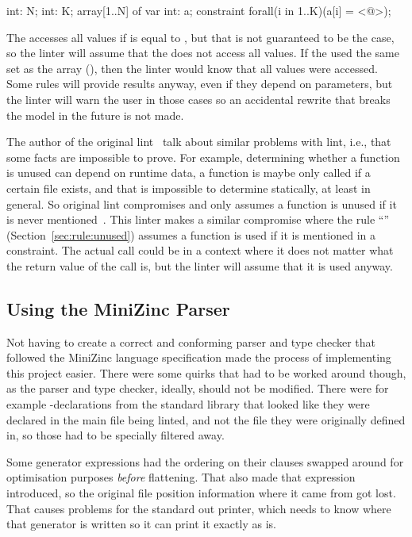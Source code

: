 \documentclass[a4paper,12pt]{article}
\newcommand{\ruleref}[1]{``\nameref{sec:rule:#1}'' (Section~\ref{sec:rule:#1})}
\begin{document}
\begin{mznnobreak}
int: N; int: K;
array[1..N] of var int: a;
constraint forall(i in 1..K)(a[i] = <@\dots@>);
\end{mznnobreak}

The  accesses all values if  is equal to , but that is not
guaranteed to be the case, so the linter will assume that the  does not access
all values. If the  used the same set as the array (), then the
linter would know that all values were accessed. Some rules will provide results anyway,
even if they depend on parameters, but the linter will warn the user in those cases so an
accidental rewrite that breaks the model in the future is not made.

The author of the original lint~\cite{lint} talk about similar problems with lint, i.e.,
that some facts are impossible to prove. For example, determining whether a function is
unused can depend on runtime data, a function is maybe only called if a certain file
exists, and that is impossible to determine statically, at least in general. So original
lint compromises and only assumes a function is unused if it is never
mentioned~\cite{lint}. This linter makes a similar compromise where the rule
\ruleref{unused} assumes a function is used if it is mentioned in a constraint. The actual
call could be in a context where it does not matter what the return value of the call is,
but the linter will assume that it is used anyway.

\subsection{Using the MiniZinc Parser}
Not having to create a correct and conforming parser and type checker that followed the
MiniZinc language specification made the process of implementing this project easier.
There were some quirks that had to be worked around though, as the parser and type
checker, ideally, should not be modified. There were for example -declarations
from the standard library that looked like they were declared in the main file being
linted, and not the file they were originally defined in, so those had to be specially
filtered away.

Some generator expressions had the ordering on their  clauses swapped around for
optimisation purposes \emph{before} flattening. That also made that expression introduced,
so the original file position information where it came from got lost. That causes
problems for the standard out printer, which needs to know where that generator is written
so it can print it exactly as is.
\end{document}

